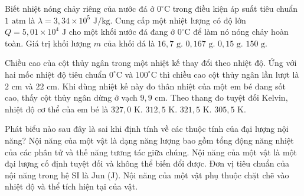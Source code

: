 \begin{ex}	Biết nhiệt nóng chảy riêng của nước đá ở $0^\circ\text{C}$ trong điều kiện áp suất tiêu chuẩn $1\text{ atm}$ là $\lambda = 3,34 \times 10^{5}\text{ J/kg}$. Cung cấp một nhiệt lượng có độ lớn $Q = 5,01 \times 10^{4}\text{ J}$ cho một khối nước đá đang ở $0^\circ\text{C}$ để làm nó nóng chảy hoàn toàn. Giá trị khối lượng $m$ của khối đá là
	\choice
	{$16,7\text{ g}$.}
	{$0,167\text{ g}$.}
	{$0,15\text{ g}$.}
	{\True $150\text{ g}$.}
\end{ex}

\begin{ex}	Chiều cao của cột thủy ngân trong một nhiệt kế thay đổi theo nhiệt độ. Ứng với hai mốc nhiệt độ tiêu chuẩn $0^\circ\text{C}$ và $100^\circ\text{C}$ thì chiều cao cột thủy ngân lần lượt là $2\text{ cm}$ và $22\text{ cm}$. Khi dùng nhiệt kế này đo thân nhiệt của một em bé đang sốt cao, thấy cột thủy ngân dừng ở vạch $9,9\text{ cm}$. Theo thang đo tuyệt đối Kelvin, nhiệt độ cơ thể của em bé là
	\choice
	{$327,0\text{ K}$.}
	{\True $312,5\text{ K}$.}
	{$321,5\text{ K}$.}
	{$305,5\text{ K}$.}
\end{ex}

\begin{ex}	Phát biểu nào sau đây là sai khi định tính về các thuộc tính của đại lượng nội năng?
	\choice
	{Nội năng của một vật là dạng năng lượng bao gồm tổng động năng nhiệt của các phân tử và thế năng tương tác giữa chúng.}
	{\True Nội năng của một vật là một đại lượng cố định tuyệt đối và không thể biến đổi được.}
	{Đơn vị tiêu chuẩn của nội năng trong hệ SI là Jun (J).}
	{Nội năng của một vật phụ thuộc chặt chẽ vào nhiệt độ và thể tích hiện tại của vật.}
\end{ex}

